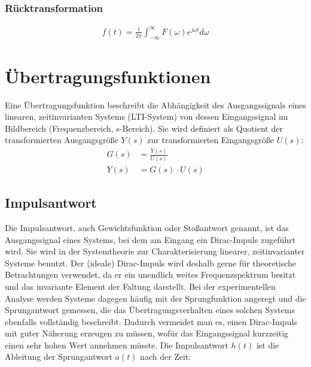 \documentclass[a4paper,10pt]{article}
\begin{document}
\subsubsection{Rücktransformation}

\begin{align}
f(t)=\frac{1}{2\pi}\int_{-\infty}^{\infty} F(\omega) e^{j\omega t}d\omega
\end{align}




\section{Übertragungsfunktionen}
Eine Übertragungsfunktion beschreibt die Abhängigkeit des Ausgangssignals eines linearen, zeitinvarianten Systems 
(LTI-System) von dessen Eingangssignal im Bildbereich (Frequenzbereich, s-Bereich). Sie wird definiert als Quotient der 
transformierten Ausgangsgröße $Y(s)$ zur transformierten Eingangsgröße $U(s)$:
\begin{align}
G(s)&=\frac{Y(s)}{U(s)}\\
Y(s)&=G(s)\cdot U(s)
\end{align}
\subsection{Impulsantwort}
Die Impulsantwort, auch Gewichtsfunktion oder Stoßantwort genannt, ist das Ausgangssignal eines Systems, bei dem am Eingang
ein Dirac-Impuls zugeführt wird. Sie wird in der Systemtheorie zur Charakterisierung linearer, zeitinvarianter Systeme benutzt.
Der (ideale) Dirac-Impuls wird deshalb gerne für theoretische Betrachtungen verwendet, da er ein unendlich weites Frequenzspektrum 
besitzt und das invariante Element der Faltung darstellt. Bei der experimentellen Analyse werden Systeme dagegen häufig mit der 
Sprungfunktion angeregt und die Sprungantwort gemessen, die das Übertragungsverhalten eines solchen Systems ebenfalls vollständig 
beschreibt. Dadurch vermeidet man es, einen Dirac-Impuls mit guter Näherung erzeugen zu müssen, wofür das Eingangssignal kurzzeitig
einen sehr hohen Wert annehmen müsste. Die Impulsantwort $h(t)$ ist die Ableitung der Sprungantwort $a(t)$ nach der Zeit:
\end{document}
